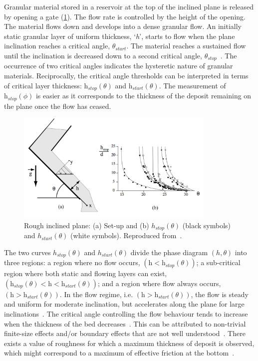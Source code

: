 Granular material stored in a reservoir at the top of the inclined plane is 
released by opening a gate (\cref{fig:Incline}). The flow rate is controlled by 
the height of the opening. The material flows down and develops into a dense 
granular flow. An initially static granular layer of uniform thickness, 
`\textit{h}', starts to flow when the plane inclination reaches a critical 
angle, $\theta_{\textit{start}}$. The material reaches a sustained flow until 
the inclination is decreased down to a second critical angle, 
$\theta_{\textit{stop}}$~\citep{Midi2004}. The occurrence of two critical 
angles indicates the hysteretic nature of granular materials. Reciprocally, the 
critical angle thresholds can be interpreted in terms of critical layer 
thickness: $\textit{h}_{\textit{stop}}(\theta)$ and 
$\textit{h}_{\textit{start}}(\theta)$. The measurement of  
$\textit{h}_{\textit{stop}}(\phi)$ is easier as it corresponds to the thickness 
of the deposit remaining on the plane once the flow has ceased. 

\begin{figure}[tbhp]
\centering
\includegraphics[width=0.85\textwidth]{Incline}
\caption{Rough inclined plane: (a) Set-up and (b) $h_{stop}(\theta)$ (black 
symbols) and $h_{start}(\theta)$ (white symbols). Reproduced 
from~\citep{Midi2004}.}
\label{fig:Incline}
\end{figure}


The two curves $h_{stop}(\theta)$ and $h_{start}(\theta)$ divide the phase 
diagram $(h,\theta)$ into three regions: a region where no flow occurs, 
$(\textit{h}<\textit{h}_{\textit{stop}}(\theta))$; a sub-critical region where 
both static and flowing layers can exist, $(\textit{h}_{\textit{stop}}(\theta) 
< \textit{h} < \textit{h}_{\textit{start}}(\theta))$; and a region where flow 
always occurs, $(\textit{h}>\textit{h}_{\textit{start}}(\theta))$. In the flow 
regime, i.e. $(\textit{h}>\textit{h}_{\textit{start}}(\theta))$, the flow is 
steady and uniform for moderate inclination, but accelerates along the plane 
for large inclinations~\citep{Midi2004}. The critical angle controlling the 
flow behaviour tends to increase when the thickness of the bed 
decreases~\citep{Pouliquen2002a,Daerr1999}. This can be attributed to 
non-trivial finite-size effects and/or boundary effects that are not well 
understood~\citep{Forterre2008}. There exists a value of roughness for which a 
maximum thickness of deposit is observed, which might correspond to a maximum
of effective friction at the bottom~\citep{Midi2004}.

